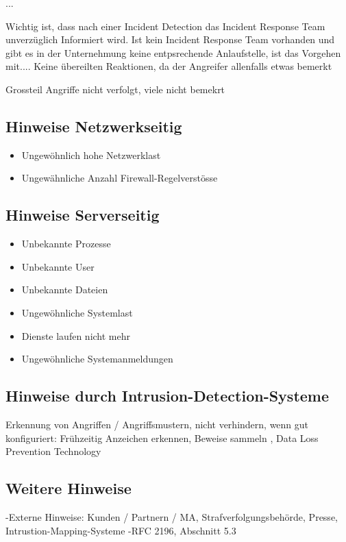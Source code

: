 ...

Wichtig ist, dass nach einer Incident Detection das Incident Response Team unverzüglich Informiert wird. Ist kein Incident Response Team vorhanden und gibt es in der Unternehmung keine entpsrechende Anlaufstelle, ist das Vorgehen mit....
Keine übereilten Reaktionen, da der Angreifer allenfalls etwas bemerkt

Grossteil Angriffe nicht verfolgt, viele nicht bemekrt

\subsection{Hinweise Netzwerkseitig}
\begin{itemize}
  \item Ungewöhnlich hohe Netzwerklast
  \item Ungewähnliche Anzahl Firewall-Regelverstösse
\end{itemize}

\subsection{Hinweise Serverseitig}
\begin{itemize}
  \item Unbekannte Prozesse
  \item Unbekannte User
  \item Unbekannte Dateien
  \item Ungewöhnliche Systemlast
  \item Dienste laufen nicht mehr
  \item Ungewöhnliche Systemanmeldungen
\end{itemize}

\subsection{Hinweise durch Intrusion-Detection-Systeme}
Erkennung von Angriffen / Angriffsmustern, nicht verhindern, wenn gut konfiguriert: Frühzeitig Anzeichen erkennen, Beweise sammeln
, Data Loss Prevention Technology

\subsection{Weitere Hinweise}
-Externe Hinweise: Kunden / Partnern / MA, Strafverfolgungsbehörde, Presse, Intrustion-Mapping-Systeme
-RFC 2196, Abschnitt 5.3

